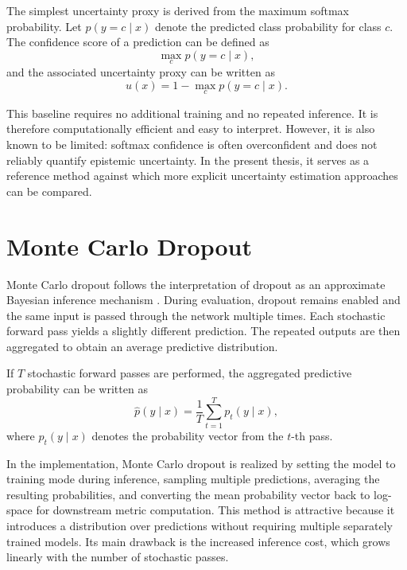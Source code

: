 The simplest uncertainty proxy is derived from the maximum softmax probability. Let $p(y=c \mid x)$ denote the predicted class probability for class $c$. The confidence score of a prediction can be defined as
\begin{equation}
    \max_c p(y=c \mid x),
\end{equation}
and the associated uncertainty proxy can be written as
\begin{equation}
    u(x) = 1 - \max_c p(y=c \mid x).
\end{equation}

This baseline requires no additional training and no repeated inference. It is therefore computationally efficient and easy to interpret. However, it is also known to be limited: softmax confidence is often overconfident and does not reliably quantify epistemic uncertainty. In the present thesis, it serves as a reference method against which more explicit uncertainty estimation approaches can be compared.

\section{Monte Carlo Dropout}

Monte Carlo dropout follows the interpretation of dropout as an approximate Bayesian inference mechanism \cite{gal2016dropout}. During evaluation, dropout remains enabled and the same input is passed through the network multiple times. Each stochastic forward pass yields a slightly different prediction. The repeated outputs are then aggregated to obtain an average predictive distribution.

If $T$ stochastic forward passes are performed, the aggregated predictive probability can be written as
\begin{equation}
    \hat{p}(y \mid x) = \frac{1}{T} \sum_{t=1}^{T} p_t(y \mid x),
\end{equation}
where $p_t(y \mid x)$ denotes the probability vector from the $t$-th pass.

In the implementation, Monte Carlo dropout is realized by setting the model to training mode during inference, sampling multiple predictions, averaging the resulting probabilities, and converting the mean probability vector back to log-space for downstream metric computation. This method is attractive because it introduces a distribution over predictions without requiring multiple separately trained models. Its main drawback is the increased inference cost, which grows linearly with the number of stochastic passes.

